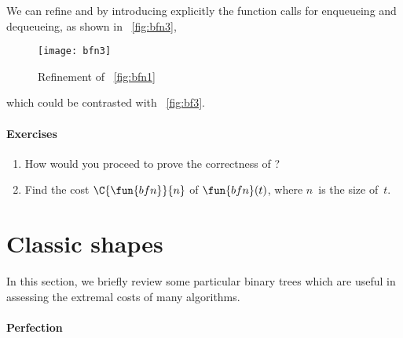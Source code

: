 We can refine  and
 by introducing
explicitly the function calls for enqueueing and dequeueing, as shown
in \fig~\vref{fig:bfn3},
\begin{figure}[t]
\centering
\texttt{[image: bfn3]}
\caption{Refinement of \fig~\vref{fig:bfn1}}
\label{fig:bfn3}
\end{figure}
which could be contrasted with \fig~\vref{fig:bf3}.

\paragraph{Exercises}
\begin{enumerate}

  \item How would you proceed to prove the correctness of
  ?

  \item Find the cost \(\C{\fun{bfn}}{n}\) of \(\fun{bfn}(t)\), where
  \(n\)~is the size
  of~\(t\).

\end{enumerate}


\section{Classic shapes}

In this section, we briefly review some particular binary trees which
are useful in assessing the extremal costs of many algorithms.

\paragraph{Perfection}
\label{par:perfection}

